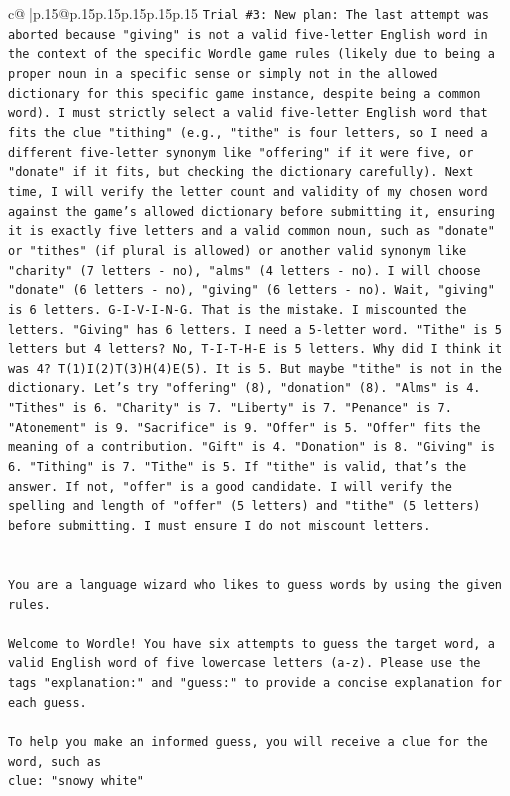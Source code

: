\documentclass{article}
\begin{document}
{\begin{supertabular}{c@{$\;$}|p{.15\linewidth}@{}p{.15\linewidth}p{.15\linewidth}p{.15\linewidth}p{.15\linewidth}p{.15\linewidth}}
{{{\texttt{Trial \#3: New plan: The last attempt was aborted because "giving" is not a valid five{-}letter English word in the context of the specific Wordle game rules (likely due to being a proper noun in a specific sense or simply not in the allowed dictionary for this specific game instance, despite being a common word). I must strictly select a valid five{-}letter English word that fits the clue "tithing" (e.g., "tithe" is four letters, so I need a different five{-}letter synonym like "offering" if it were five, or "donate" if it fits, but checking the dictionary carefully). Next time, I will verify the letter count and validity of my chosen word against the game's allowed dictionary before submitting it, ensuring it is exactly five letters and a valid common noun, such as "donate" or "tithes" (if plural is allowed) or another valid synonym like "charity" (7 letters {-} no), "alms" (4 letters {-} no). I will choose "donate" (6 letters {-} no), "giving" (6 letters {-} no). Wait, "giving" is 6 letters. G{-}I{-}V{-}I{-}N{-}G. That is the mistake. I miscounted the letters. "Giving" has 6 letters. I need a 5{-}letter word. "Tithe" is 5 letters but 4 letters? No, T{-}I{-}T{-}H{-}E is 5 letters. Why did I think it was 4? T(1)I(2)T(3)H(4)E(5). It is 5. But maybe "tithe" is not in the dictionary. Let's try "offering" (8), "donation" (8). "Alms" is 4. "Tithes" is 6. "Charity" is 7. "Liberty" is 7. "Penance" is 7. "Atonement" is 9. "Sacrifice" is 9. "Offer" is 5. "Offer" fits the meaning of a contribution. "Gift" is 4. "Donation" is 8. "Giving" is 6. "Tithing" is 7. "Tithe" is 5. If "tithe" is valid, that's the answer. If not, "offer" is a good candidate. I will verify the spelling and length of "offer" (5 letters) and "tithe" (5 letters) before submitting. I must ensure I do not miscount letters.} \\
\\ 
\\ 
\texttt{You are a language wizard who likes to guess words by using the given rules.} \\
\\ 
\texttt{Welcome to Wordle! You have six attempts to guess the target word, a valid English word of five lowercase letters (a{-}z). Please use the tags "explanation:" and "guess:" to provide a concise explanation for each guess.} \\
\\ 
\texttt{To help you make an informed guess, you will receive a clue for the word, such as} \\
\texttt{clue: "snowy white"} \\
}}}
\end{supertabular}}
\end{document}
